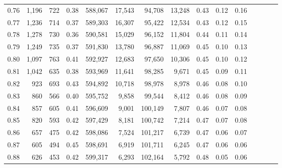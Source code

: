 \begin{tabular}{rrrcrrrrrrrrrrr}
0.76 &   1,196 &    722 &                                       0.38 &  588,067 &   17,543 &   94,708 &   13,248 &  0.43 &  0.12 &                         0.16 \\
0.77 &   1,236 &    714 &                                       0.37 &  589,303 &   16,307 &   95,422 &   12,534 &  0.43 &  0.12 &                         0.15 \\
0.78 &   1,278 &    730 &                                       0.36 &  590,581 &   15,029 &   96,152 &   11,804 &  0.44 &  0.11 &                         0.14 \\
0.79 &   1,249 &    735 &                                       0.37 &  591,830 &   13,780 &   96,887 &   11,069 &  0.45 &  0.10 &                         0.13 \\
0.80 &   1,097 &    763 &                                       0.41 &  592,927 &   12,683 &   97,650 &   10,306 &  0.45 &  0.10 &                         0.12 \\
0.81 &   1,042 &    635 &                                       0.38 &  593,969 &   11,641 &   98,285 &    9,671 &  0.45 &  0.09 &                         0.11 \\
0.82 &     923 &    693 &                                       0.43 &  594,892 &   10,718 &   98,978 &    8,978 &  0.46 &  0.08 &                         0.10 \\
0.83 &     860 &    566 &                                       0.40 &  595,752 &    9,858 &   99,544 &    8,412 &  0.46 &  0.08 &                         0.09 \\
0.84 &     857 &    605 &                                       0.41 &  596,609 &    9,001 &  100,149 &    7,807 &  0.46 &  0.07 &                         0.08 \\
0.85 &     820 &    593 &                                       0.42 &  597,429 &    8,181 &  100,742 &    7,214 &  0.47 &  0.07 &                         0.08 \\
0.86 &     657 &    475 &                                       0.42 &  598,086 &    7,524 &  101,217 &    6,739 &  0.47 &  0.06 &                         0.07 \\
0.87 &     605 &    494 &                                       0.45 &  598,691 &    6,919 &  101,711 &    6,245 &  0.47 &  0.06 &                         0.06 \\
0.88 &     626 &    453 &                                       0.42 &  599,317 &    6,293 &  102,164 &    5,792 &  0.48 &  0.05 &                         0.06 \\

\end{tabular}
